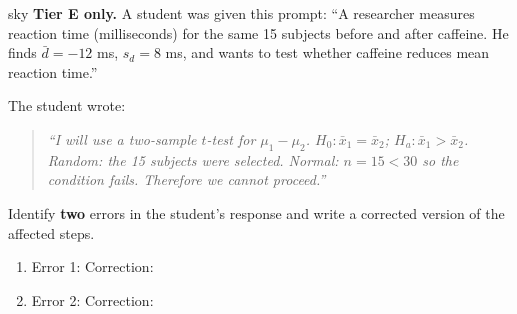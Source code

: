 \documentclass[10pt]{article}
\begin{document}
\begin{scenariobox}{sky}
\textbf{Tier E only.} \; A student was given this prompt: ``A researcher measures reaction time
(milliseconds) for the same 15 subjects before and after caffeine. He finds
$\bar d = -12$ ms, $s_d = 8$ ms, and wants to test whether caffeine reduces mean reaction time.''

The student wrote:
\begin{quote}
\textit{``I will use a two-sample $t$-test for $\mu_1 - \mu_2$. $H_0: \bar x_1 = \bar x_2$;
$H_a: \bar x_1 > \bar x_2$. Random: the 15 subjects were selected. Normal: $n = 15 < 30$ so
the condition fails. Therefore we cannot proceed.''
}
\end{quote}

Identify \textbf{two} errors in the student's response and write a corrected version of the
affected steps.

\begin{enumerate}
  \item Error 1: \writeline \writeline
        Correction: \writeline \writeline
  \item Error 2: \writeline \writeline
        Correction: \writeline \writeline
\end{enumerate}
\end{scenariobox}
\end{document}
